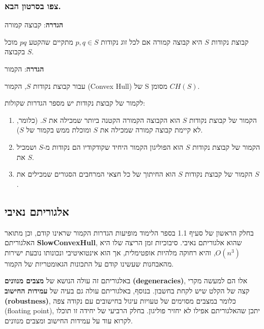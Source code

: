 \documentclass[
]{book}
\begin{document}
\hypertarget{ux5e6ux5e4ux5d5-ux5d1ux5e1ux5e8ux5d8ux5d5ux5df-ux5d4ux5d1ux5d0.-1}{%
\subsubsection*{צפו בסרטון הבא.}\label{ux5e6ux5e4ux5d5-ux5d1ux5e1ux5e8ux5d8ux5d5ux5df-ux5d4ux5d1ux5d0.-1}}

\textbf{הגדרה}: קבוצה קמורה

קבוצת נקודות \(S\) היא קבוצה קמורה אם לכל זוג נקודות \(p,q\in S\) מתקיים שהקטע \(pq\) מוכל בקבוצה \(S\).

\textbf{הגדרה}: הקמור

עבור קבוצת נקודות \(S\), הקמור (Convex Hull) של S מסומן \(CH(S)\).

לקמור של קבוצת נקודות יש מספר הגדרות שקולות:

\begin{enumerate}
\def\labelenumi{\arabic{enumi}.}
\item
  הקמור של קבוצת נקודות \(S\) הוא הקבוצה הקמורה הקטנה ביותר שמכילה את \(S\). (כלומר, לא קיימת קבוצה קמורה שמכילה את \(S\) ומוכלת ממש בקמור של \(S\)).
\item
  הקמור של קבוצת נקודות \(S\) הוא הפוליגון הקמור היחיד שקודקודיו הם נקודות מ-\(S\) ושמכיל את \(S\).
\item
  הקמור של קבוצת נקודות \(S\) הוא החיתוך של כל חצאי המרחבים הסגורים שמכילים את \(S\).
\end{enumerate}

\hypertarget{naive-alg}{%
\subsection{אלגוריתם נאיבי}\label{naive-alg}}

בחלק הראשון של סעיף 1.1 בספר הלימוד מופיעות הגדרות הקמור שראינו קודם, וכן מתואר האלגוריתם \textbf{SlowConvexHull}, שהוא אלגוריתם נאיבי. סיבוכיות זמן הריצה שלו היא \(O(n^3)\), והיא רחוקה מלהיות אופטימלית, אך הוא אינטואיטיבי ונכונותו נובעת ישירות מהאבחנות שעשינו קודם על התכונות הגאומטריות של הקמור.

באלגוריתם זה עולה הנושא של \textbf{מצבים מנוונים} \textbf{(degeneracies)}, אלו הם למעשה מקרי קצה של הקלט שיש לקחת בחשבון. בנוסף, באלגוריתם עולה גם בעיה של \textbf{עמידות החישוב} \textbf{(robustness)}, כלומר במצבים מסוימים של טעויות עיגול בחישובים עם נקודה צפה (floating point), יתכן שהאלגוריתם אפילו לא יחזיר פוליגון. בחלק הרביעי של יחידה זו תוכלו לקרוא עוד על עמידות החישוב ומצבים מנוונים.
\end{document}
